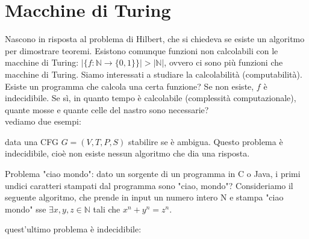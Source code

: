 \chapter{Macchine di Turing}\label{cha:macchine-di-turing}

Nascono in risposta al problema di Hilbert, che si chiedeva se esiste un algoritmo per dimostrare teoremi.
Esistono comunque funzioni non calcolabili con le macchine di Turing:
$|\{ f:\mathbb{N}\to\{0,1\} \}| > |\mathbb{N}|$, ovvero ci sono più funzioni che macchine di Turing.
Siamo interessati a studiare la calcolabilità (computabilità).
Esiste un programma che calcola una certa funzione? Se non esiste, $f$ è indecidibile. Se sì, in quanto tempo è calcolabile (complessità computazionale), quante mosse e quante celle del nastro sono necessarie?\\
vediamo due esempi:
\begin{example}
data una CFG $G=(V,T,P,S)$ stabilire se è ambigua. Questo problema è indecidibile, cioè non esiste nessun algoritmo che dia una risposta.
\end{example}
\begin{example}
Problema "ciao mondo": dato un sorgente di un programma in C o Java, i primi undici caratteri
stampati dal programma sono "ciao, mondo"?
Consideriamo il seguente algoritmo, che prende in input un numero intero N e stampa "ciao mondo" sse
$\exists x,y,z\in \mathbb{N}$ tali che
$x^n+y^n=z^n$.
\end{example}
quest'ultimo problema è indecidibile:
